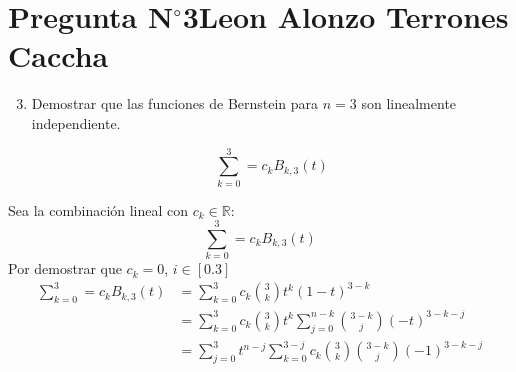 \section{Pregunta N$^{\circ}$3\qquad Leon Alonzo Terrones Caccha}

\begin{frame}
    \begin{enumerate}\setcounter{enumi}{2}
        \item
              Demostrar que las funciones de Bernstein para $n=3$ son linealmente independiente.

              \[\sum_{k=0}^{3}=c_{k}B_{k,3}(t)\]

    \end{enumerate}

    \begin{solution}
        Sea la combinación lineal con $c_k\in\mathbb{R}:$
        \[\sum_{k=0}^{3}=c_{k}B_{k,3}(t)\]
        Por demostrar que $c_k=0$, $i\in[0.3]$
        \begin{align*}
            \sum_{k=0}^{3}=c_{k}B_{k,3}(t) & =\sum_{k=0}^{3}c_k\binom{3}{k}t^k(1-t)^{3-k}                                        \\
                                           & =\sum_{k=0}^{3}{c_k\binom{3}{k}t^k\sum_{j=0}^{n-k}\binom{3-k}{j}{(-t)^{3-k-j}}}     \\
                                           & =\sum_{j=0}^{3}{t^{n-j}\sum_{k=0}^{3-j}{c_k\binom{3}{k}\binom{3-k}{j}(-1)^{3-k-j}}}
        \end{align*}


\end{solution}
\end{frame}
